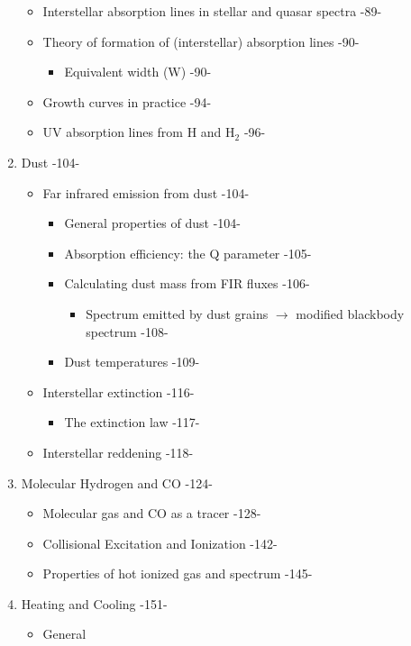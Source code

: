 \documentclass{article}
\begin{document}
\begin{enumerate}[label=\Roman*.]
\begin{itemize}
  \item Interstellar absorption lines in stellar and quasar spectra -89-
  \item Theory of formation of (interstellar) absorption lines -90-
      \begin{itemize}
          \item Equivalent width (W) -90-
      \end{itemize}
  \item Growth curves in practice -94-
  \item UV absorption lines from H and H$_2$ -96-
\end{itemize}
\item Dust -104-
    \begin{itemize}
  \item Far infrared emission from dust -104-
  \begin{itemize}
    \item General properties of dust -104-
    \item Absorption efficiency: the Q parameter -105-
    \item Calculating dust mass from FIR fluxes -106-
    \begin{itemize}
      \item Spectrum emitted by dust grains $\rightarrow$
      modified blackbody spectrum -108-
    \end{itemize}
    \item Dust temperatures -109-
  \end{itemize}
  \item Interstellar extinction -116-
  \begin{itemize}
    \item The extinction law -117-
  \end{itemize}
  \item Interstellar reddening -118-
    \end{itemize}
  \item Molecular Hydrogen and CO -124-
      \begin{itemize}
  \item Molecular gas and CO as a tracer -128-
  \item Collisional Excitation and Ionization -142-
  \item Properties of hot ionized gas and spectrum -145-
  \end{itemize}
  \item Heating and Cooling -151-
    \begin{itemize}
      \item General

\end{itemize}
\end{enumerate}
\end{document}
